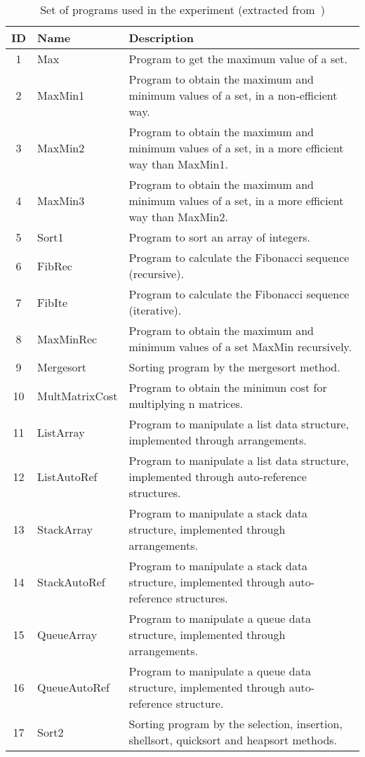 \begin{table*}[!ht]
    \caption{Set of programs used in the experiment (extracted from~\cite{Souza12ESEI})}
    \label{tab:programs}
    \centering\scriptsize
    \begin{tabular}{|c|l|l|}\hline
    \textbf{ID} & \textbf{Name} & \textbf{Description}\\\hline
1 & Max &Program to get the maximum value of a set.\\\hline
2 & MaxMin1& Program to obtain the maximum and minimum values of a set, in a non-efficient way.\\\hline
3 & MaxMin2& Program to obtain the maximum and minimum values of a set, in a more efficient way than MaxMin1.\\\hline
4 & MaxMin3& Program to obtain the maximum and minimum values of a set, in a more efficient way than MaxMin2.\\\hline
5 & Sort1& Program to sort an array of integers.\\\hline
6 & FibRec& Program to calculate the Fibonacci sequence (recursive).\\\hline
7 & FibIte& Program to calculate the Fibonacci sequence (iterative).\\\hline
8 & MaxMinRec& Program to obtain the maximum and minimum values of a set MaxMin recursively.\\\hline
9 & Mergesort& Sorting program by the mergesort method.\\\hline
10& MultMatrixCost& Program to obtain the minimun cost for multiplying n matrices.\\\hline
11& ListArray& Program to manipulate a list data structure, implemented through arrangements.\\\hline
12& ListAutoRef& Program to manipulate a list data structure, implemented through auto-reference structures.\\\hline
13& StackArray& Program to manipulate a stack data structure, implemented through arrangements.\\\hline
14& StackAutoRef& Program to manipulate a stack data structure, implemented through auto-reference structures.\\\hline
15& QueueArray& Program to manipulate a queue data structure, implemented through arrangements.\\\hline
16& QueueAutoRef& Program to manipulate a queue data structure, implemented through auto-reference structure.\\\hline
17& Sort2& Sorting program by the selection, insertion, shellsort, quicksort and heapsort methods.\\\hline

\end{tabular}
\end{table*}
